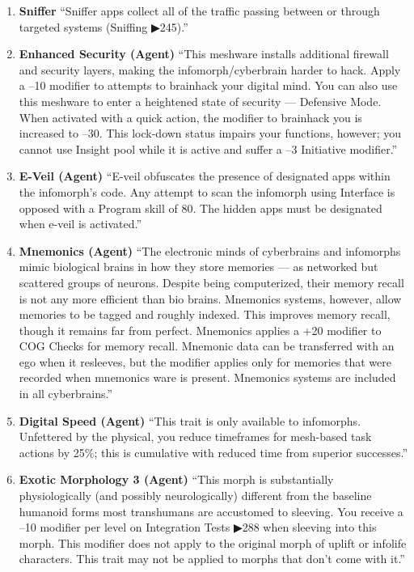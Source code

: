 \begin{enumerate}
    \item \textbf{Sniffer} “Sniffer apps collect all of the traffic passing between or through targeted systems (Sniffing ▶245).” \citep[pg. 326]{ep2e_1.1_2019}

    \item \textbf{Enhanced Security (Agent)} “This meshware installs additional firewall and security layers, making the infomorph/cyberbrain harder to hack. Apply a –10 modifier to attempts to brainhack your digital mind. You can also use this meshware to enter a heightened state of security — Defensive Mode. When activated with a quick action, the modifier to brainhack you is increased to –30. This lock-down status impairs your functions, however; you cannot use Insight pool while it is active and suffer a –3 Initiative modifier.” \citep[pg. 326]{ep2e_1.1_2019}

    \item \textbf{E-Veil (Agent)} “E-veil obfuscates the presence of designated apps within the infomorph’s code. Any attempt to scan the infomorph using Interface is opposed with a Program skill of 80. The hidden apps must be designated when e-veil is activated.” \citep[pg. 326]{ep2e_1.1_2019}

    \item \textbf{Mnemonics (Agent)} “The electronic minds of cyberbrains and infomorphs mimic biological brains in how they store memories — as networked but scattered groups of neurons. Despite being computerized, their memory recall is not any more efficient than bio brains. Mnemonics systems, however, allow memories to be tagged and roughly indexed. This improves memory recall, though it remains far from perfect. Mnemonics applies a +20 modifier to COG Checks for memory recall. Mnemonic data can be transferred with an ego when it resleeves, but the modifier applies only for memories that were recorded when mnemonics ware is present. Mnemonics systems are included in all cyberbrains.” \citep[pg. 316]{ep2e_1.1_2019}

    \item \textbf{Digital Speed (Agent)} “This trait is only available to infomorphs. Unfettered by the physical, you reduce timeframes for mesh-based task actions by 25\%; this is cumulative with reduced time from superior successes.” \citep[pg. 73]{ep2e_1.1_2019}

    \item \textbf{Exotic Morphology 3 (Agent)} “This morph is substantially physiologically (and possibly neurologically) different from the baseline humanoid forms most transhumans are accustomed to sleeving. You receive a –10 modifier per level on Integration Tests ▶288 when sleeving into this morph. This modifier does not apply to the original morph of uplift or infolife characters. This trait may not be applied to morphs that don’t come with it.” \citep[pg. 78]{ep2e_1.1_2019}

\end{enumerate}


